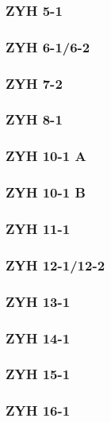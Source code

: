 \documentclass[12pt, a4paper,titlepage]{article}
\begin{document}
{\subsubsection*{ZYH 5-1}

\subsubsection*{ZYH 6-1/6-2}

\subsubsection*{ZYH 7-2}

\subsubsection*{ZYH 8-1}

\subsubsection*{ZYH 10-1 A}

\subsubsection*{ZYH 10-1 B}

\subsubsection*{ZYH 11-1}

\subsubsection*{ZYH 12-1/12-2}

\subsubsection*{ZYH 13-1}

\subsubsection*{ZYH 14-1}

\subsubsection*{ZYH 15-1}

\subsubsection*{ZYH 16-1}

}
\end{document}
